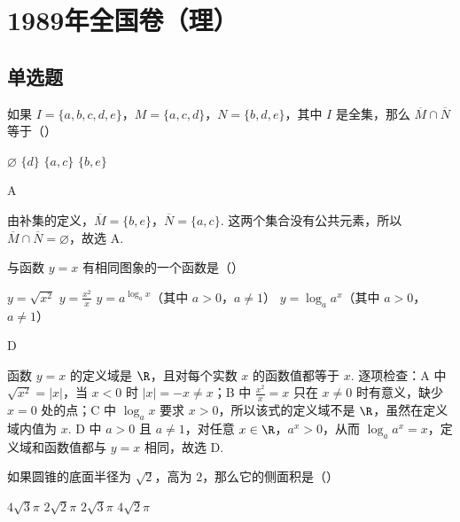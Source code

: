 \documentclass[UTF8,a4paper,oneside,11pt]{ctexbook}
\begin{document}
\mainmatter

\chapter{1989年全国卷（理）}

\section{单选题}

\begin{problem}
如果 \(I = \{a, b, c, d, e\}\)，\(M = \{a, c, d\}\)，\(N = \{b, d, e\}\)，其中 \(I\) 是全集，那么 \(\overline{M} \cap \overline{N}\) 等于（\quad）

\choices
    {\(\varnothing\)}
    {\(\{d\}\)}
    {\(\{a, c\}\)}
    {\(\{b, e\}\)}
\end{problem}

\begin{answer}
A
\end{answer}

\begin{solution}
由补集的定义，\(\overline{M}=\{b,e\}\)，\(\overline{N}=\{a,c\}\). 这两个集合没有公共元素，所以 \(\overline{M}\cap\overline{N}=\varnothing\)，故选 A.
\end{solution}

\begin{problem}
与函数 \(y = x\) 有相同图象的一个函数是（\quad）

\choices
    {\(y = \sqrt{x^2}\)}
    {\(y = \frac{x^2}{x}\)}
    {\(y = a^{\log_a x}\)（其中 \(a > 0\)，\(a \neq 1\)）}
    {\(y = \log_a a^x\)（其中 \(a > 0\)，\(a \neq 1\)）}
\end{problem}

\begin{answer}
D
\end{answer}

\begin{solution}
函数 \(y=x\) 的定义域是 \(\R\)，且对每个实数 \(x\) 的函数值都等于 \(x\). 逐项检查：A 中 \(\sqrt{x^2}=|x|\)，当 \(x<0\) 时 \(|x|=-x\neq x\)；B 中 \(\frac{x^2}{x}=x\) 只在 \(x\neq0\) 时有意义，缺少 \(x=0\) 处的点；C 中 \(\log_a x\) 要求 \(x>0\)，所以该式的定义域不是 \(\R\)，虽然在定义域内值为 \(x\). D 中 \(a>0\) 且 \(a\neq1\)，对任意 \(x\in\R\)，\(a^x>0\)，从而 \(\log_a a^x=x\)，定义域和函数值都与 \(y=x\) 相同，故选 D.
\end{solution}

\begin{problem}
如果圆锥的底面半径为 \(\sqrt{2}\)，高为 \(2\)，那么它的侧面积是（\quad）

\choices
    {\(4\sqrt{3}\pi\)}
    {\(2\sqrt{2}\pi\)}
    {\(2\sqrt{3}\pi\)}
    {\(4\sqrt{2}\pi\)}
\end{problem}
\end{document}
